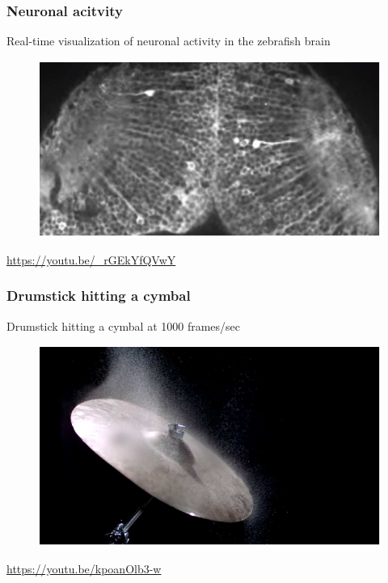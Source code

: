 \documentclass{beamer}
\begin{document}

\begin{frame}
\frametitle{Neuronal acitvity}
Real-time visualization of neuronal activity in the zebrafish brain
\begin{figure}
\includegraphics[scale=0.7]{neuronal_activity}
\end{figure}
\url{https://youtu.be/_rGEkYfQVwY}
\end{frame}


\begin{frame}
\frametitle{Drumstick hitting a cymbal}
Drumstick hitting a cymbal at 1000 frames/sec
\begin{figure}
\includegraphics[scale=.6]{cymbal}
\end{figure}
\url{https://youtu.be/kpoanOlb3-w}
\end{frame}

\end{document}
